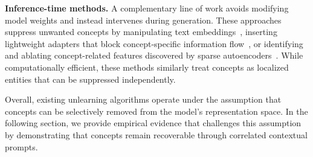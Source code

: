 \textbf{Inference-time methods.}
A complementary line of work avoids modifying model weights and instead intervenes during generation. 
These approaches suppress unwanted concepts by manipulating text embeddings~\cite{li2024get}, inserting lightweight adapters that block concept-specific information flow~\cite{lyu2024one}, or identifying and ablating concept-related features discovered by sparse autoencoders~\cite{cywinski2025saeuron}. 
While computationally efficient, these methods similarly treat concepts as localized entities that can be suppressed independently.

Overall, existing unlearning algorithms operate under the assumption that concepts can be selectively removed from the model’s representation space. In the following section, we provide empirical evidence that challenges this assumption by demonstrating that concepts remain recoverable through correlated contextual prompts.

